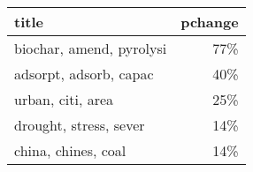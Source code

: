 \begin{tabular}{p{1.2cm}r}
\toprule
                    title &  pchange \\
\midrule
 biochar, amend, pyrolysi &      77\% \\
   adsorpt, adsorb, capac &      40\% \\
        urban, citi, area &      25\% \\
   drought, stress, sever &      14\% \\
      china, chines, coal &      14\% \\
\bottomrule
\end{tabular}
